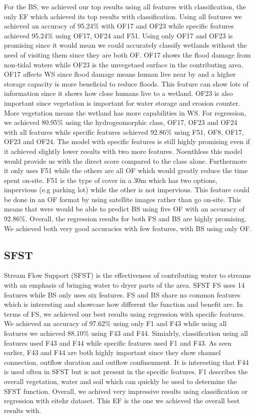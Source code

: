 \documentclass[12pt,letterpaper]{article}
\begin{document}
For the \ac{BS}, we achieved our top results using all features with classification, the only \ac{EF} which achieved its top results with classification.
Using all features we achieved an accuracy of 95.24\% with OF17 and OF23 while specific features achieved 95.24\% using OF17, OF24 and F51.
Using only OF17 and OF23 is promising since it would mean we could accurately classify wetlands without the need of visiting them since they are both OF.
OF17 shows the flood damage from non-tidal waters while OF23 is the unvegetaed surface in the contributing area.
OF17 affects \ac{WS} since flood damage means human live near by and a higher storage capacity is more beneficial to reduce floods.
This feature can show lots of information since it shows how close humans live to a wetland.
OF23 is also important since vegetation is important for water storage and erosion counter.
More vegetation means the wetland has more capabilities in \ac{WS}.
For regression, we achieved 80.95\% using the hydrogeomorphic class, OF17, OF23 and OF24 with all features while specific features achieved 92.86\% using F51, OF8, OF17, OF23 and OF24.
The model with specific features is still highly promising even if it achieved slightly lower results with two more features.
Noenthless this model would provide us with the direct score compared to the class alone.
Furthermore it only uses F51 while the others are all OF which would greatly reduce the time spent on-site.
F51 is the type of cover in a 30m which has two options, impervious (e.g parking lot) while the other is not impervious.
This feature could be done in an OF format by using satellite images rather than go on-site.
This means that were would be able to predict \ac{BS} using five OF with an accuracy of 92.86\%.
Overall, the regression results for both \ac{FS} and \ac{BS} are highly promising.
We achieved both very good accuracies with few features, with \ac{BS} using only OF.


\subsection{SFST}
Stream Flow Support (\ac{SFST}) is the effectiveness of contributing water to streams with an emphasis of bringing water to dryer parts of the area.
\ac{SFST} \ac{FS} uses 14 features while \ac{BS} only uses six features.
\ac{FS} and \ac{BS} share no common features which is interesting and showcase how different the function and benefit are.
In terms of \ac{FS}, we achieved our best results using regression with specific features.
We achieved an accuracy of 97.62\% using only F1 and F43 while using all features we achieved 88.10\% using F43 and F44.
Simialrly, classification using all features used F43 and F44 while specific features used F1 and F43.
As seen earlier, F43 and F44 are both highly important since they show channel connection, outflow duration and outflow confinenment.
It is interesting that F44 is used often in \ac{SFST} but is not present in the specific features.
F1 describes the overall vegetation, water and soil which can quickly be used to determine the \ac{SFST} function.
Overall, we achived very impressive results using classification or regression with eitehr dataset.
This \ac{EF} is the one we achieved the overall best results with.
\end{document}
